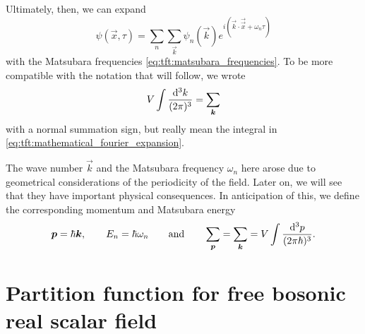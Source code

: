 Ultimately, then, we can expand
\begin{equation}
	\psi(\vec{x}, \tau) = \sum_n \sum_\vec{k} \psi_n(\vec{k}) e^{i (\vec{k} \cdot \vec{\vec{x}} + \omega_n \tau)}
\label{eq:tft:fourier_series}
\end{equation}
with the Matsubara frequencies \eqref{eq:tft:matsubara_frequencies}.
To be more compatible with the notation that will follow, we wrote
\begin{equation}
	V \int \frac{\mathop{}\!\mathrm{d}^3 k}{(2 \pi)^3} = \sum_{\bm{k}}
\label{eq:tft:continuum_limit}
\end{equation}
with a normal summation sign, but really mean the integral in \eqref{eq:tft:mathematical_fourier_expansion}.

The wave number $\vec{k}$ and the Matsubara frequency $\omega_n$ here arose due to geometrical considerations of the periodicity of the field.
Later on, we will see that they have important physical consequences.
In anticipation of this, we define the corresponding momentum and Matsubara energy
\begin{equation}
	{\bm{p}} = \hbar {\bm{k}}, \qquad
	E_n = \hbar \omega_n \qquad \text{and} \qquad
	\sum_{\bm{p}} = \sum_{\bm{k}} = V \int \frac{\mathop{}\!\mathrm{d}^3 p}{(2 \pi \hbar)^3}.
\label{eq:tft:matsubara_energies}
\end{equation}

\section{Partition function for free bosonic real scalar field}


